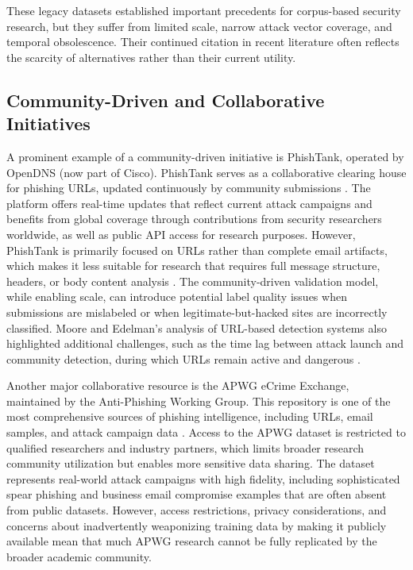 These legacy datasets established important precedents for corpus-based security research, but they suffer from limited scale, narrow attack vector coverage, and temporal obsolescence. Their continued citation in recent literature often reflects the scarcity of alternatives rather than their current utility.

\subsection{Community-Driven and Collaborative Initiatives}

A prominent example of a community-driven initiative is PhishTank, operated by OpenDNS (now part of Cisco). PhishTank serves as a collaborative clearing house for phishing URLs, updated continuously by community submissions \cite{phishtank2023}. The platform offers real-time updates that reflect current attack campaigns and benefits from global coverage through contributions from security researchers worldwide, as well as public \ac{API} access for research purposes. However, PhishTank is primarily focused on URLs rather than complete email artifacts, which makes it less suitable for research that requires full message structure, headers, or body content analysis \cite{saleh2024phishing}. The community-driven validation model, while enabling scale, can introduce potential label quality issues when submissions are mislabeled or when legitimate-but-hacked sites are incorrectly classified. Moore and Edelman's analysis of URL-based detection systems also highlighted additional challenges, such as the time lag between attack launch and community detection, during which URLs remain active and dangerous \cite{moore2009measuring}.

Another major collaborative resource is the APWG eCrime Exchange, maintained by the Anti-Phishing Working Group. This repository is one of the most comprehensive sources of phishing intelligence, including URLs, email samples, and attack campaign data \cite{apwg2023trends}. Access to the APWG dataset is restricted to qualified researchers and industry partners, which limits broader research community utilization but enables more sensitive data sharing. The dataset represents real-world attack campaigns with high fidelity, including sophisticated spear phishing and business email compromise examples that are often absent from public datasets. However, access restrictions, privacy considerations, and concerns about inadvertently weaponizing training data by making it publicly available mean that much APWG research cannot be fully replicated by the broader academic community.

